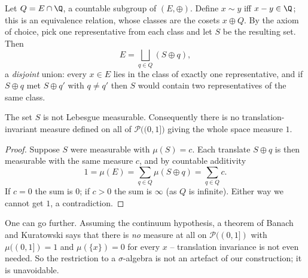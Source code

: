 Let $Q = E \cap \Q$, a countable subgroup of $(E, \oplus)$. Define $x \sim y$ iff $x - y \in \Q$; this is an equivalence relation, whose classes are the cosets $x \oplus Q$. By the axiom of choice, pick one representative from each class and let $S$ be the resulting set. Then
$$
E = \bigsqcup_{q \in Q} (S \oplus q),
$$
a \emph{disjoint} union: every $x \in E$ lies in the class of exactly one representative, and if $S \oplus q$ met $S \oplus q'$ with $q \neq q'$ then $S$ would contain two representatives of the same class.

\begin{center}
\end{center}

\begin{theorem}[Vitali]
	The set $S$ is not Lebesgue measurable. Consequently there is no translation-invariant measure defined on all of $\mathcal{P}\big((0,1]\big)$ giving the whole space measure $1$.
\end{theorem}
\begin{proof}
	Suppose $S$ were measurable with $\mu(S) = c$. Each translate $S \oplus q$ is then measurable with the same measure $c$, and by countable additivity
	$$
	1 = \mu(E) = \sum_{q \in Q} \mu(S \oplus q) = \sum_{q\in Q} c.
	$$
	If $c = 0$ the sum is $0$; if $c > 0$ the sum is $\infty$ (as $Q$ is infinite). Either way we cannot get $1$, a contradiction.
\end{proof}

\begin{remark}
	One can go further. Assuming the continuum hypothesis, a theorem of Banach and Kuratowski says that there is \emph{no} measure at all on $\mathcal{P}((0,1])$ with $\mu((0,1]) = 1$ and $\mu(\{x\}) = 0$ for every $x$ -- translation invariance is not even needed. So the restriction to a $\sigma$-algebra is not an artefact of our construction; it is unavoidable.
\end{remark}

